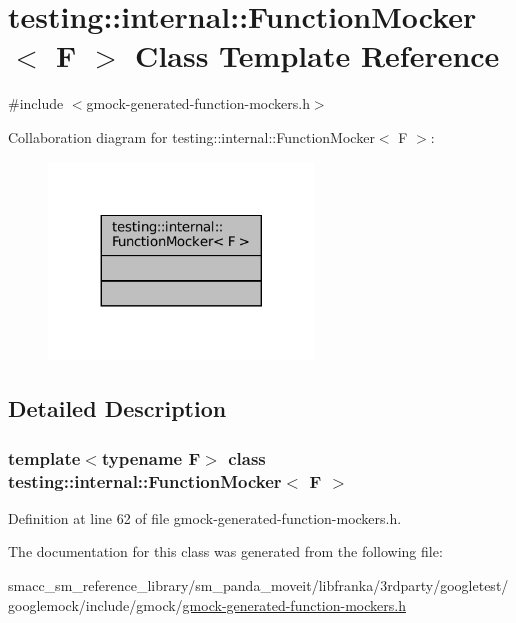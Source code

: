 \hypertarget{classtesting_1_1internal_1_1FunctionMocker}{}\section{testing\+:\+:internal\+:\+:Function\+Mocker$<$ F $>$ Class Template Reference}
\label{classtesting_1_1internal_1_1FunctionMocker}


{\ttfamily \#include $<$gmock-\/generated-\/function-\/mockers.\+h$>$}



Collaboration diagram for testing\+:\+:internal\+:\+:Function\+Mocker$<$ F $>$\+:
\nopagebreak
\begin{figure}[H]
\begin{center}
\leavevmode
\includegraphics[width=200pt]{classtesting_1_1internal_1_1FunctionMocker__coll__graph}
\end{center}
\end{figure}


\subsection{Detailed Description}
\subsubsection*{template$<$typename F$>$\newline
class testing\+::internal\+::\+Function\+Mocker$<$ F $>$}



Definition at line 62 of file gmock-\/generated-\/function-\/mockers.\+h.



The documentation for this class was generated from the following file\+:\begin{DoxyCompactItemize}
\item 
smacc\+\_\+sm\+\_\+reference\+\_\+library/sm\+\_\+panda\+\_\+moveit/libfranka/3rdparty/googletest/googlemock/include/gmock/\hyperlink{gmock-generated-function-mockers_8h}{gmock-\/generated-\/function-\/mockers.\+h}\end{DoxyCompactItemize}
